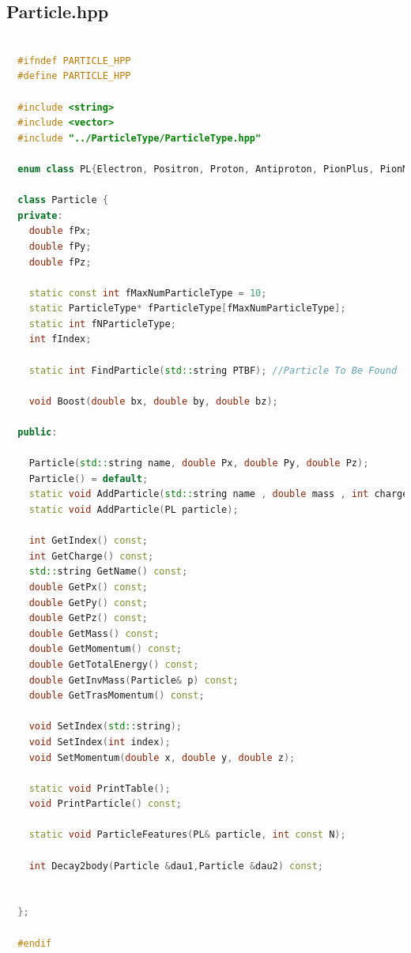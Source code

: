 \documentclass[a4paper, 11pt]{article}
\begin{document}
      \subsection{Particle.hpp}
        \begin{lstlisting}[language=c++, style=code]

  #ifndef PARTICLE_HPP
  #define PARTICLE_HPP

  #include <string>
  #include <vector>
  #include "../ParticleType/ParticleType.hpp"

  enum class PL{Electron, Positron, Proton, Antiproton, PionPlus, PionMinus, Pion0, KaonPlus, KaonMinus, Kaon0};

  class Particle {
  private:
    double fPx;
    double fPy;
    double fPz;

    static const int fMaxNumParticleType = 10;
    static ParticleType* fParticleType[fMaxNumParticleType];
    static int fNParticleType;
    int fIndex;

    static int FindParticle(std::string PTBF); //Particle To Be Found

    void Boost(double bx, double by, double bz);

  public:

    Particle(std::string name, double Px, double Py, double Pz);
    Particle() = default;
    static void AddParticle(std::string name , double mass , int charge , double with=0);
    static void AddParticle(PL particle);

    int GetIndex() const;
    int GetCharge() const;
    std::string GetName() const;
    double GetPx() const;
    double GetPy() const;
    double GetPz() const;
    double GetMass() const;
    double GetMomentum() const;
    double GetTotalEnergy() const;
    double GetInvMass(Particle& p) const;
    double GetTrasMomentum() const;

    void SetIndex(std::string);
    void SetIndex(int index);
    void SetMomentum(double x, double y, double z);

    static void PrintTable();
    void PrintParticle() const;

    static void ParticleFeatures(PL& particle, int const N);

    int Decay2body(Particle &dau1,Particle &dau2) const;


  };

  #endif
        \end{lstlisting}
\end{document}
